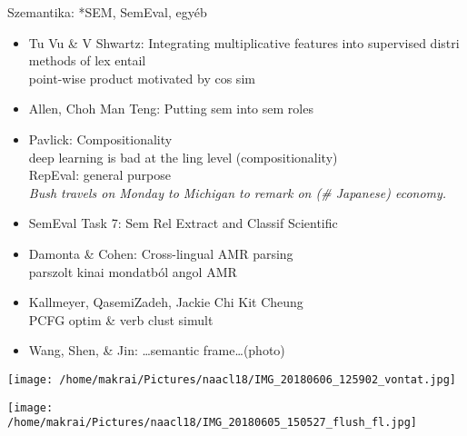 \documentclass{beamer}
\begin{document}
    \begin{frame}{Szemantika: *SEM, SemEval, egyéb}
      \begin{itemize}
        \item Tu Vu \& V Shwartz: 
          Integrating multiplicative features into supervised distri methods of lex entail 
              \\ point-wise product motivated by cos sim
            \item Allen, Choh Man Teng: Putting sem into sem roles 
            \item Pavlick: Compositionality
              \\ deep learning is bad at the ling level (compositionality)
          \\ RepEval: general purpose
          \\ \emph{Bush travels on Monday to Michigan to remark on (\# Japanese)
          economy.}
        \item {SemEval Task 7: Sem Rel Extract and Classif Scientific}
        \item Damonta \& Cohen: Cross-lingual AMR parsing
          \\ parszolt kinai mondatból angol AMR
        \item Kallmeyer, QasemiZadeh, Jackie Chi Kit Cheung
          \\ {PCFG optim \& verb clust} simult
        \item Wang, Shen, \& Jin: \dots semantic frame\dots  (photo) 
      \end{itemize} 
    \end{frame}

    \begin{frame}[allowframebreaks]
\texttt{[image: /home/makrai/Pictures/naacl18/IMG\_20180606\_125902\_vontat.jpg]} 

      \texttt{[image: /home/makrai/Pictures/naacl18/IMG\_20180605\_150527\_flush\_fl.jpg]}
    \end{frame}
\end{document}
